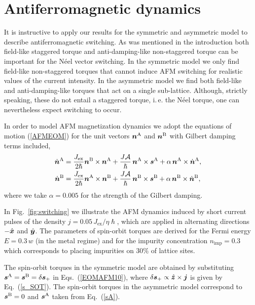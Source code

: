 \section{Antiferromagnetic dynamics}

It is instructive to apply our results for the symmetric and asymmetric model to describe antiferromagnetic switching. As was mentioned in the introduction both field-like staggered torque and anti-damping-like non-staggered torque can be important for the N\'eel vector switching. In the symmetric model we only find field-like non-staggered torques that cannot induce AFM switching for realistic values of the current intensity. In the asymmetric model we find both field-like and anti-damping-like torques that act on a single sub-lattice. Although, strictly speaking, these do not entail a staggered torque, i.\,e. the N\'eel torque, one can nevertheless expect switching to occur. 

In order to model AFM magnetization dynamics we adopt the equations of motion (\ref{AFMEOM}) for the unit vectors $\boldsymbol{n}^\text{A}$ and $\boldsymbol{n}^\text{B}$  with Gilbert damping terms included,
\beml
\label{EOMAFM10}
\begin{align}
\dot{\boldsymbol{n}}^\text{A} &= \frac{J_\text{ex}}{2\hslash}\boldsymbol{n}^\text{B}\times \boldsymbol{n}^\text{A}+ \frac{J\mathcal{A}}{\hslash}\, \boldsymbol{n}^\text{A}\times \boldsymbol{s}^\text{A} +\alpha\, \boldsymbol{n}^\text{A}\times \dot{\boldsymbol{n}}^\text{A},\\
\dot{\boldsymbol{n}}^\text{B}&= \frac{J_\text{ex}}{2\hslash} \boldsymbol{n}^\text{A}\times \boldsymbol{n}^\text{B}+ \frac{J\mathcal{A}}{\hslash}\, \boldsymbol{n}^\text{B}\times \boldsymbol{s}^\text{B}+\alpha\, \boldsymbol{n}^\text{B}\times \dot{\boldsymbol{n}}^\text{B},
\end{align}
\eml
where we take $\alpha=0.005$ for the strength of the Gilbert damping.  

In Fig.~\ref{fig:switching} we illustrate the AFM dynamics induced by short current pulses of the density $j=0.05\,J_\text{ex}/\eta\hslash$, which are applied in alternating directions $-\hat{\boldsymbol{x}}$ and $\hat{\boldsymbol{y}}$. The parameters of spin-orbit torques are derived for the Fermi energy $E =0.3\,w$ (in the metal regime) and for the impurity concentration $n_\text{imp}=0.3$ which corresponds to placing impurities on $30\%$ of lattice sites.   

The spin-orbit torques in the symmetric model are obtained by substituting $\boldsymbol{s}^\text{A}=\boldsymbol{s}^\text{B} = \delta\boldsymbol{s}_+$ in Eqs.~(\ref{EOMAFM10}), where $\delta\boldsymbol{s}_+ \propto \hat{\boldsymbol{z}}\times\boldsymbol{j}$ is given by Eq.~(\ref{s_SOT}). The spin-orbit torques in the asymmetric model correspond to $\boldsymbol{s}^\text{B}=0$ and $\boldsymbol{s}^\text{A}$ taken from Eq.~(\ref{sA}).
 
